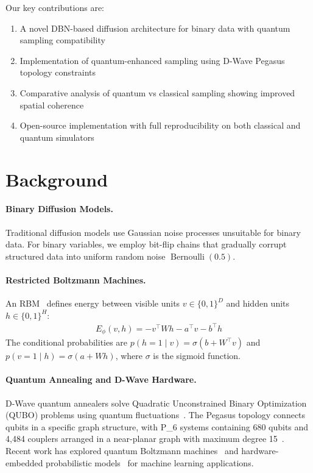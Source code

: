 \documentclass[11pt]{article}
\begin{document}
Our key contributions are:
\begin{enumerate}
    \item A novel DBN-based diffusion architecture for binary data with quantum sampling compatibility
    \item Implementation of quantum-enhanced sampling using D-Wave Pegasus topology constraints  
    \item Comparative analysis of quantum vs classical sampling showing improved spatial coherence
    \item Open-source implementation with full reproducibility on both classical and quantum simulators
\end{enumerate}

\section{Background}

\paragraph{Binary Diffusion Models.}
Traditional diffusion models use Gaussian noise processes unsuitable for binary data. For binary variables, we employ bit-flip chains that gradually corrupt structured data into uniform random noise $\operatorname{Bernoulli}(0.5)$.

\paragraph{Restricted Boltzmann Machines.}
An RBM~\cite{hinton2006,salakhutdinov2009} defines energy between visible units $v\in\{0,1\}^{D}$ and hidden units $h\in\{0,1\}^{H}$:
\begin{align}
E_\phi(v,h) = - v^\top W h - a^\top v - b^\top h
\end{align}
The conditional probabilities are $p(h=1\mid v)=\sigma(b+W^\top v)$ and $p(v=1\mid h)=\sigma(a+Wh)$, where $\sigma$ is the sigmoid function.

\paragraph{Quantum Annealing and D-Wave Hardware.}
D-Wave quantum annealers solve Quadratic Unconstrained Binary Optimization (QUBO) problems using quantum fluctuations~\cite{lucas2014,biswas2017}. The Pegasus topology connects qubits in a specific graph structure, with P_6 systems containing 680 qubits and 4,484 couplers arranged in a near-planar graph with maximum degree 15~\cite{dwave2021}. Recent work has explored quantum Boltzmann machines~\cite{amin2018} and hardware-embedded probabilistic models~\cite{benedetti2017} for machine learning applications.
\end{document}
